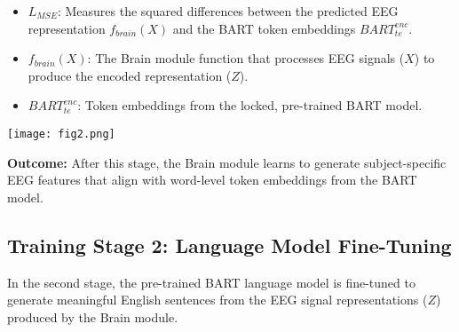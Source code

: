 \documentclass[journal]{IEEEtran}
\begin{document}
\begin{itemize}
	\item \(L_{MSE}\): Measures the squared differences between the predicted EEG representation \(f_{brain}(X)\) and the BART token embeddings \(BART_{te}^{enc}\).
	\item \(f_{brain}(X)\): The Brain module function that processes EEG signals (\(X\)) to produce the encoded representation (\(Z\)).
	\item \(BART_{te}^{enc}\): Token embeddings from the locked, pre-trained BART model.
\end{itemize}
\begin{center}
\end{center}
\begin{figure*}[t]
	\centering
	\texttt{[image: fig2.png]} %
	\vspace{-10pt} %
	\caption\normalsize{}
	\label{fig:workflow}
\end{figure*}
\noindent \textbf{Outcome:} After this stage, the Brain module learns to generate subject-specific EEG features that align with word-level token embeddings from the BART model.
\subsection{Training Stage 2: Language Model Fine-Tuning}
In the second stage, the pre-trained BART language model is fine-tuned to generate meaningful English sentences from the EEG signal representations (\(Z\)) produced by the Brain module.
\end{document}
